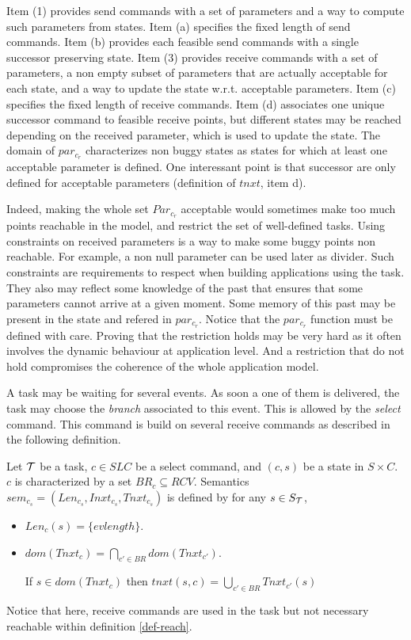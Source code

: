 \documentclass{article}
\begin{document}
Item (1) provides send commands with a set of parameters and a way to compute such parameters from states. Item (a) specifies the fixed length of send commands. Item (b) provides each feasible send commands with a single successor preserving state. Item (3) provides receive commands with a set of parameters, a non empty subset of parameters that are actually acceptable for each state, and a way to update the state w.r.t. acceptable parameters. Item (c) specifies the fixed length of receive commands.
Item (d) associates one unique successor command to feasible receive points, but different states may be reached depending on the received parameter, which is used to update the state. The domain of $par_{c_r}$ characterizes non buggy states as states for which at least one acceptable parameter is defined. One interessant point is that successor are only defined for acceptable parameters (definition of $tnxt$, item d). 

Indeed, making the whole set $Par_{c_r}$ acceptable would sometimes make too much points reachable in the model, and restrict the set of well-defined tasks. Using constraints on received parameters is a way to make some buggy points non reachable. For example, a non null parameter can be used later as divider. Such constraints are requirements to respect when building applications using the task. They also may reflect some knowledge of the past that ensures that some parameters cannot arrive at a given moment. Some memory of this past may be present in the state and refered in $par_{c_r}$. Notice that the $par_{c_r}$ function must be defined with care. Proving that the restriction holds may be very hard as it often involves the dynamic behaviour at application level. And a restriction that do not hold compromises the coherence of the whole application model.

 A task may be waiting for several events. As soon a one of them is delivered, the task may choose the {\em branch} associated to this event. This is allowed by the {\em select} command. This command is build on several receive commands as described in the following definition.
\begin{definition}\label{def-slc} Let ${\cal T}$ be a task, $c\in S\!LC$ be a select command, and $(c,s)$ be a state in $S\times C$. $c$ is characterized by a set $BR_c\subseteq RCV$. Semantics $sem_{c_s}=(Len_{c_s},Inxt_{c_s},Tnxt_{c_s})$ is defined by for any $s\in S_{\cal T}$,
\begin{itemize}
\item $Len_c(s)=\{evlength\}$.
\item $dom(T\!nxt_c)=\bigcap_{c'\in BR}dom(T\!nxt_{c'})$.\par
      If $s\in dom(T\!nxt_c)$ then $tnxt(s,c)=\bigcup_{c'\in BR}T\!nxt_{c'}(s)$
\end{itemize}
\end{definition}
Notice that here, receive commands are used in the task but not necessary reachable within definition \ref{def-reach}. 
\end{document}
